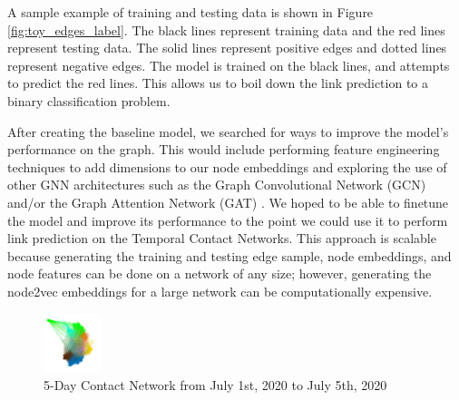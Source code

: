 \documentclass[times, 10pt,twocolumn]{article}
\begin{document}
A sample example of training and testing data is shown in Figure \ref{fig:toy_edges_label}. The black lines represent training data and the red lines represent testing data. The solid lines represent positive edges and dotted lines represent negative edges. The model is trained on the black lines, and attempts to predict the red lines. This allows us to boil down the link prediction to a binary classification problem.

After creating the baseline model, we searched for ways to improve the model's performance on the graph. This would include performing feature engineering techniques to add dimensions to our node embeddings and exploring the use of other GNN architectures such as the Graph Convolutional Network (GCN) and/or the Graph Attention Network (GAT) \cite{kipf2017semisupervised} \cite{veličković2018graph}. We hoped to be able to finetune the model and improve its performance to the point we could use it to perform link prediction on the Temporal Contact Networks. This approach is scalable because generating the training and testing edge sample, node embeddings, and node features can be done on a network of any size; however, generating the node2vec embeddings for a large network can be computationally expensive.






\vspace{-15pt}
\begin{figure}[h]
    \centering
    \includegraphics[width=0.15\textwidth]{imgs/5_day_network.png}
    \caption{5-Day Contact Network from July 1st, 2020 to July 5th, 2020}
    \label{fig:my_label}
\end{figure}
\end{document}

